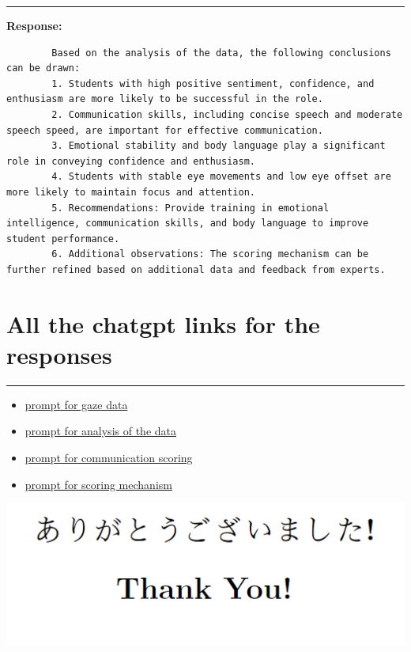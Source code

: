 \documentclass[11pt,a4paper]{article}
\begin{document}
\begin{center}
    \color{red}\rule{1\linewidth}{0.5mm}
\end{center}

\textbf{Response:}
\begin{tcolorbox}[title=Response]
    \begin{lstlisting}
        Based on the analysis of the data, the following conclusions can be drawn:
        1. Students with high positive sentiment, confidence, and enthusiasm are more likely to be successful in the role.
        2. Communication skills, including concise speech and moderate speech speed, are important for effective communication.
        3. Emotional stability and body language play a significant role in conveying confidence and enthusiasm.
        4. Students with stable eye movements and low eye offset are more likely to maintain focus and attention.
        5. Recommendations: Provide training in emotional intelligence, communication skills, and body language to improve student performance.
        6. Additional observations: The scoring mechanism can be further refined based on additional data and feedback from experts.
    \end{lstlisting}
\end{tcolorbox}

\section{All the chatgpt links for the responses}

\begin{center}
    \color{red}\rule{1\linewidth}{1mm}
\end{center}

\begin{itemize}
    \item \href{https://chatgpt.com/share/66eacd2e-b8f8-8009-8507-b3895c422e0b}{prompt for gaze data}
    \item \href{https://chatgpt.com/share/66eac84c-2c84-800f-b800-e42a0607ce97}{prompt for analysis of the data}   
    \item \href{https://chatgpt.com/share/66eac52b-9638-8009-aceb-bece7faa6be8}{prompt for communication scoring}
    \item \href{https://chatgpt.com/share/66eac84c-2c84-800f-b800-e42a0607ce97}{prompt for scoring mechanism}
\end{itemize}

\newpage

\vfill

\begin{center}
    \includegraphics[width=1\columnwidth]{images/thank.png}
\end{center}
\vfill

\end{document}
